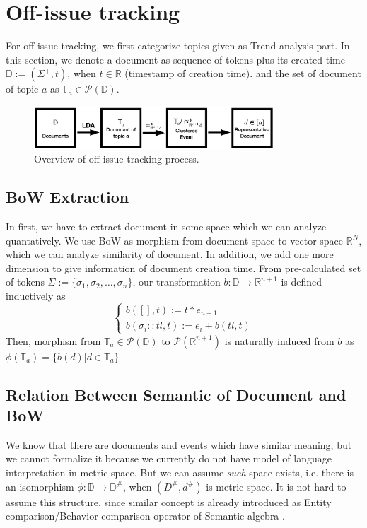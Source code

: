 \section{Off-issue tracking}
For off-issue tracking, we first categorize topics given as Trend analysis part.
In this section, we denote a document as sequence of tokens plus its created time $\mathbb{D} := (\Sigma^{+}, t)$, when $t \in \mathbb{R}$ (timestamp of creation time).
and the set of document of topic $a$ as $\mathbb{T}_{a} \in \mathcal{P}(\mathbb{D})$.

\begin{figure}[t]
    \centering
    \includegraphics[width=0.8\textwidth]{off-issue-overview}
    \caption{Overview of off-issue tracking process.}
\end{figure}

\subsection{BoW Extraction}
In first, we have to extract document in some space which we can analyze quantatively.
We use BoW as morphism from document space to vector space $\mathbb{R}^{N}$, which we can
analyze similarity of document. In addition, we add one more dimension to give information
of document creation time. From pre-calculated set of tokens $\Sigma := \{ \sigma_{1}, \sigma_{2}, \ldots, \sigma_{n} \}$,
our transformation $b: \mathbb{D} \rightarrow \mathbb{R}^{n+1}$ is defined inductively as
\[
\begin{cases}
    b([], t) := t * e_{n+1}\\
    b(\sigma_{i} :: tl, t) := e_{i} + b(tl, t)
\end{cases} 
\]
Then, morphism from $\mathbb{T}_{a} \in \mathcal{P}(\mathbb{D})$ to $\mathcal{P}(\mathbb{R}^{n+1})$ is naturally induced from $b$ as
$\phi(\mathbb{T}_{a}) = \{b(d) | d \in \mathbb{T}_{a}\}$

\subsection{Relation Between Semantic of Document and BoW}
We know that there are documents and events which have similar meaning, but we cannot formalize it because we currently do not have
model of language interpretation in metric space. But we can assume \textit{such} space exists, i.e. there is an isomorphism
$\phi: \mathbb{D} \rightarrow \mathbb{D}^{\#}$, when $(D^{\#}, d^{\#})$ is metric space. It is not hard to assume this structure,
since similar concept is already introduced as Entity comparison/Behavior comparison operator of Semantic algebra \cite{wang2013semantic}.

